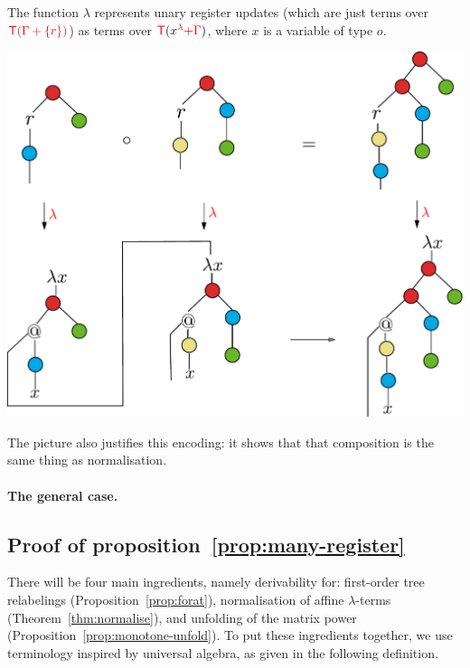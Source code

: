 The function $\lambda$ represents unary register updates (which are just terms over ${\color{red}{{\color{red}{\mathsf T}}(\Gamma+\{r\})}}$) as terms over ${\color{red}{\mathsf T}}({x}^{\color{red}{\lambda}}{\color{red}{+ \Gamma}})$, where $x$ is a variable of type $o$.
 \begin{center}
\includegraphics[scale=.26]{composition=normalisation.pdf}
\end{center}
The picture also justifies this encoding: it shows that that composition is the same thing as normalisation.

\paragraph{The general case.}

\subsection{Proof of proposition~\ref{prop:many-register}}\label{subsec:proof}

There will be four main ingredients, namely derivability for: first-order tree relabelings (Proposition~\ref{prop:forat}), normalisation of affine $\lambda$-terms (Theorem~\ref{thm:normalise}), and unfolding of the matrix power (Proposition~\ref{prop:monotone-unfold}).
\label{sec:proof-of-prop} 
To put these ingredients together,  we use  terminology inspired by universal algebra, as given in the following definition. 


